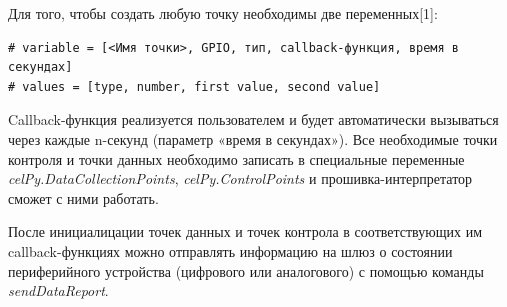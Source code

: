 \documentclass[11pt]{article}
\begin{document}
Для того, чтобы создать любую точку необходимы две переменных[1]:

\begin{verbatim}
# variable = [<Имя точки>, GPIO, тип, callback-функция, время в секундах]
# values = [type, number, first value, second value]
\end{verbatim}

Callback-функция реализуется пользователем и будет автоматически вызываться через каждые
n-секунд (параметр «время в секундах»). Все необходимые точки контроля и точки данных
необходимо записать в специальные переменные \emph{celPy.DataCollectionPoints},
\emph{celPy.ControlPoints} и прошивка-интерпретатор сможет с ними работать.

После инициалицации точек данных и точек контрола в соответствующих им 
callback-функциях можно отправлять информацию на шлюз  о состоянии периферийного 
устройства (цифрового или аналогового) с помощью команды \emph{sendDataReport}.
\end{document}
